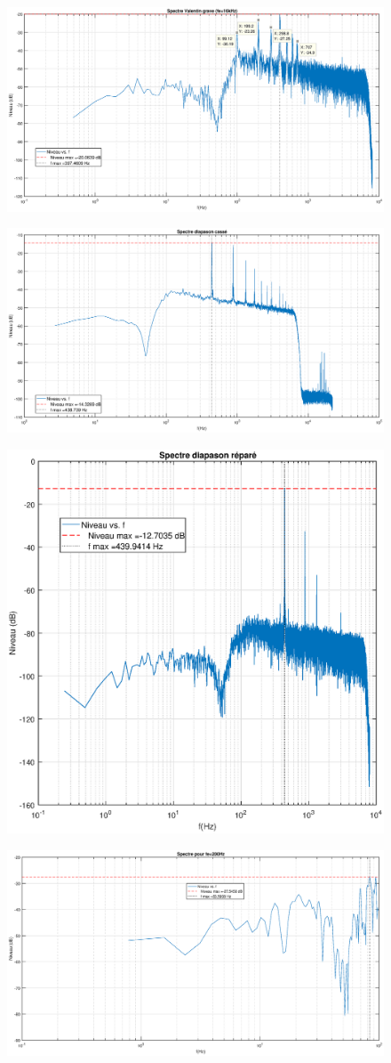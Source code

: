 \documentclass[12pt,a4paper]{article}
\begin{document}
\begin{figure}
	\centering
	\includegraphics[width=0.7\linewidth]{"res/Valentin grave"}
	\caption{}
	\label{fig:valentin-grave}
\end{figure}
\begin{figure}
	\centering
	\includegraphics[width=0.7\linewidth]{"res/diapason casse"}
	\caption{}
	\label{fig:diapason-casse}
\end{figure}
\begin{figure}
	\centering
	\includegraphics[width=0.7\linewidth]{"res/diapason repare"}
	\caption{}
	\label{fig:diapason-repare}
\end{figure}
\begin{figure}
	\centering
	\includegraphics[width=0.7\linewidth]{"res/echantillonnage 200Hz"}
	\caption{}
	\label{fig:echantillonnage-200hz}
\end{figure}
\end{document}
